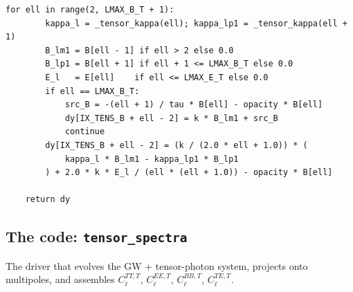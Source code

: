 \begin{codebox}
\begin{lstlisting}[style=python]
    for ell in range(2, LMAX_B_T + 1):
        kappa_l = _tensor_kappa(ell); kappa_lp1 = _tensor_kappa(ell + 1)
        B_lm1 = B[ell - 1] if ell > 2 else 0.0
        B_lp1 = B[ell + 1] if ell + 1 <= LMAX_B_T else 0.0
        E_l   = E[ell]    if ell <= LMAX_E_T else 0.0
        if ell == LMAX_B_T:
            src_B = -(ell + 1) / tau * B[ell] - opacity * B[ell]
            dy[IX_TENS_B + ell - 2] = k * B_lm1 + src_B
            continue
        dy[IX_TENS_B + ell - 2] = (k / (2.0 * ell + 1.0)) * (
            kappa_l * B_lm1 - kappa_lp1 * B_lp1
        ) + 2.0 * k * E_l / (ell * (ell + 1.0)) - opacity * B[ell]

    return dy
\end{lstlisting}
\end{codebox}

\subsection{The code: \texttt{tensor\_spectra}}

The driver that evolves the GW + tensor-photon system, projects onto multipoles, and assembles $C_\ell^{TT,T}$, $C_\ell^{EE,T}$, $C_\ell^{BB,T}$, $C_\ell^{TE,T}$.

